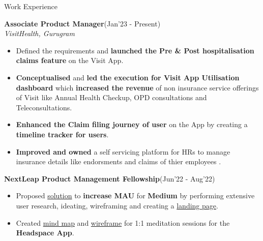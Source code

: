 \documentclass{resume}
\newcommand{\sepval}{-0.5em}
\begin{document}
\begin{rSection}{Work Experience}
\vspace{-.4cm}
 
\item{\bf {\bf Associate Product Manager}}\hfill{(Jan'23 - Present)}\\
\emph{VisitHealth, Gurugram}\\
[-0.4cm]

\begin{itemize}[leftmargin=*]

	\itemsep \sepval

	\item Defined the requirements and {\bf launched the Pre \& Post hospitalisation claims
		feature} on the Visit App.

	\item {\bf Conceptualised} and {\bf led the execution for Visit App Utilisation dashboard} which
		{\bf increased the revenue} of non insurance service offerings of Visit like Annual Health
		Checkup, OPD consultations and Teleconsultations.

	\item {\bf Enhanced the Claim filing journey of user} on the App by creating a {\bf timeline
		tracker for users}.

	\item {\bf Improved and owned} a self servicing platform for HRs to manage insurance
		details like endorsments and claims of thier employees .

\end{itemize}
\vspace{-.2cm}

\item{\bf {\bf NextLeap Product Management Fellowship}}\hfill{(Jun'22 - Aug'22)}\\
[-0.4cm]

\begin{itemize}[leftmargin=*]

	\itemsep \sepval

	\item Proposed \href{https://drive.google.com/drive/u/0/folders/1WsIuj0mg7Tzor1ZqkgHoIVEpC83IzDQO}{solution} to {\bf increase MAU} for {\bf Medium} by performing extensive user research, ideating, wireframing and creating a \href{https://mediummau.unicornplatform.page/}{landing page}. 

	\item Created \href{https://drive.google.com/file/d/1-avX66iiwxiya52PV7Py78P-dR9KBc26/view?usp=sharing}{mind map} and \href{https://drive.google.com/file/d/1Q1WOr4dA-qPECZdUN8NicpNdlkdFcFjl/view?usp=sharing}{wireframe} for 1:1 meditation sessions for the {\bf Headspace App}. 


\end{itemize}
\end{rSection}
\end{document}
